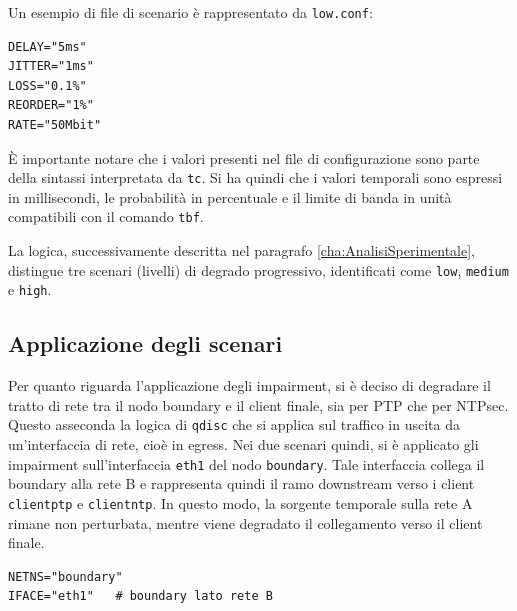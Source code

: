 Un esempio di file di scenario è rappresentato da \texttt{low.conf}:

\begin{listing}[H]
\begin{verbatim}
DELAY="5ms"
JITTER="1ms"
LOSS="0.1%"
REORDER="1%"
RATE="50Mbit"
\end{verbatim}
\caption{Esempio di file di scenario low.conf.}
\label{lst:low-conf}
\end{listing}

È importante notare che i valori presenti nel file di configurazione sono parte della
sintassi interpretata da \texttt{tc}. Si ha quindi che i valori temporali sono espressi
in millisecondi, le probabilità in percentuale e il limite di banda in unità
compatibili con il comando \texttt{tbf}.

La logica, successivamente descritta nel paragrafo \ref{cha:AnalisiSperimentale},
distingue tre scenari (livelli) di degrado progressivo, identificati come
\texttt{low}, \texttt{medium} e \texttt{high}.

\subsection{Applicazione degli scenari}

Per quanto riguarda l'applicazione degli impairment, si è deciso di degradare il
tratto di rete tra il nodo boundary e il client finale, sia per PTP che per NTPsec.
Questo asseconda la logica di \texttt{qdisc} che si applica sul traffico in uscita
da un'interfaccia di rete, cioè in egress. Nei due scenari quindi, si è
applicato gli impairment sull'interfaccia \texttt{eth1} del nodo \texttt{boundary}.
Tale interfaccia collega il boundary alla rete B e rappresenta quindi il ramo downstream
verso i client \texttt{clientptp} e \texttt{clientntp}. In questo modo, la sorgente
temporale sulla rete A rimane non perturbata, mentre viene degradato il
collegamento verso il client finale.

\begin{listing}[H]
\begin{verbatim}
NETNS="boundary"
IFACE="eth1"   # boundary lato rete B
\end{verbatim}
\caption{Selezione dell'interfaccia degradata per PTP e NTPsec.}
\label{lst:ptp-ntpsec-iface}
\end{listing}


